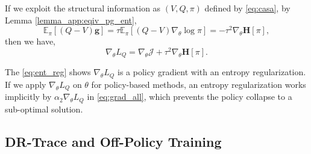 If we exploit the structural information as $(V, Q, \pi)$ defined by \eqref{eq:casa}, by Lemma \ref{lemma_app:eqiv_pg_ent},
$$
\mathbb{E}_\pi \left[(Q - V) \textbf{g} \right] 
= \tau \mathbb{E}_\pi \left[(Q - V) \nabla_\theta \log \pi \right]
= - \tau^2 \nabla_\theta \textbf{H}[\pi],
$$
then we have,
\begin{equation}
\label{eq:ent_reg}
    \nabla_\theta L_Q 
    = \nabla_\theta \mathcal{J} + \tau^2 \nabla_\theta \textbf{H}[\pi].
\end{equation}

The \eqref{eq:ent_reg} shows $\nabla_\theta L_Q$ is a policy gradient with an entropy regularization.
If we apply $\nabla_\theta L_Q$ on $\theta$ for policy-based methods, an entropy regularization works implicitly by $\alpha_2 \nabla_\theta L_Q$ in \eqref{eq:grad_all}, which prevents the policy collapse to a sub-optimal solution. 

\subsection{DR-Trace and Off-Policy Training}
\label{sec:dr}




